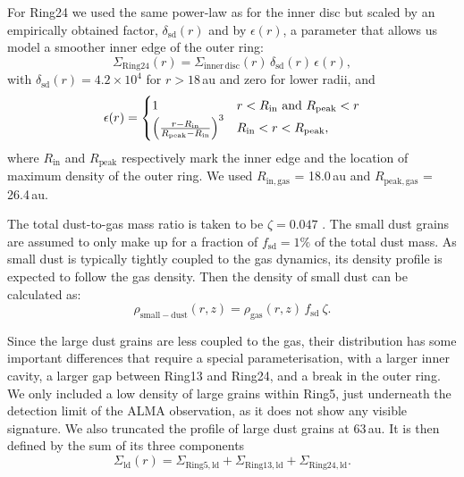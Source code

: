 \documentclass[fleqn,usenatbib,useAMS]{mnras}
\begin{document}
For Ring24 we used the same power-law as for the inner disc but scaled by an empirically obtained factor, $\delta_{\mathrm{sd}}(r)$ and by $\epsilon(r)$, a parameter that allows us model a smoother inner edge of the outer ring:
\begin{equation}
  \Sigma_{\mathrm{Ring24}}(r) = \Sigma_{\mathrm{inner\,disc}}(r)\, \delta_{\mathrm{sd}}(r)\,\epsilon(r),
\end{equation}
with $\delta_{\mathrm{sd}}(r) = 4.2\times 10^4$ for $r > 18$\,au and zero for lower radii, and
\begin{equation}
    \epsilon(r) = 
    \begin{cases}
  1    & r < R_\mathrm{in} \,\, {\rm and} \,\, R_\mathrm{peak} < r \\
  \left(\frac{ r - R_\mathrm{in}}{R_\mathrm{peak} - R_\mathrm{in}}\right)^3 & R_\mathrm{in} < r < R_\mathrm{peak},
    \end{cases}
\end{equation}
where $R_\mathrm{in}$ and $R_\mathrm{peak}$ respectively mark the inner edge and the location of maximum density of the outer ring. We used $R_\mathrm{in,gas}$ = 18.0\,au and $R_\mathrm{peak,gas}$ = 26.4\,au.

The total dust-to-gas mass ratio is taken to be $\zeta = 0.047$ \citep[as in][]{Rosenfeld_2013}. The small dust grains are assumed to only make up for a fraction of $f_\mathrm{sd}=1\%$ of the total dust mass. As small dust is typically tightly coupled to the gas dynamics, its density profile is expected to follow the gas density. Then the density of small dust can be calculated as:
\begin{equation}
\rho_{\mathrm{small-dust}}(r,z)=\rho_{\mathrm{gas}}(r,z)\, f_{\mathrm{sd}} \: \zeta .
\end{equation}

Since the large dust grains are less coupled to the gas, their distribution has some important differences that require a special parameterisation, with a larger inner cavity, a larger gap between Ring13 and Ring24, and a break in the outer ring. We only included a low density of large grains within Ring5, just underneath the detection limit of the ALMA observation, as it does not show any visible signature. We also truncated the profile of large dust grains at 63\,au. It is then defined by the sum of its three components
\begin{equation}
  \Sigma_{\mathrm{ld}}(r) = \Sigma_{\mathrm{Ring5,ld}} + 
  \Sigma_{\mathrm{Ring13,ld}} + \Sigma_{\mathrm{Ring24,ld}}.
\end{equation}
\end{document}
